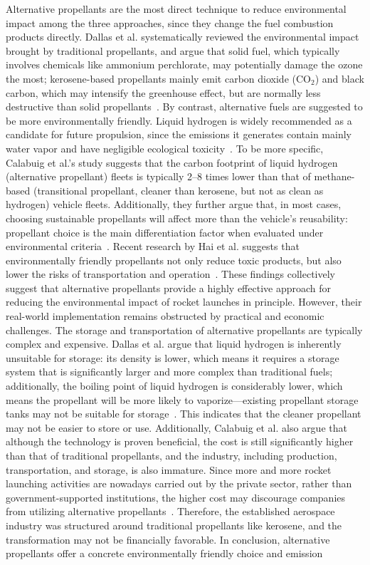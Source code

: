 \documentclass[12pt]{article}
\begin{document}
Alternative propellants are the most direct technique to reduce environmental impact among the three approaches, since they change the fuel combustion products directly. Dallas et al. systematically reviewed the environmental impact brought by traditional propellants, and argue that solid fuel, which typically involves chemicals like ammonium perchlorate, may potentially damage the ozone the most; kerosene-based propellants mainly emit carbon dioxide (CO$_2$) and black carbon, which may intensify the greenhouse effect, but are normally less destructive than solid propellants~\citep{dallas2020review,brown2024inventory}. By contrast, alternative fuels are suggested to be more environmentally friendly. Liquid hydrogen is widely recommended as a candidate for future propulsion, since the emissions it generates contain mainly water vapor and have negligible ecological toxicity~\citep{dallas2020review,barato2023fuels}. To be more specific, Calabuig et al.'s study suggests that the carbon footprint of liquid hydrogen (alternative propellant) fleets is typically 2--8 times lower than that of methane-based (transitional propellant, cleaner than kerosene, but not as clean as hydrogen) vehicle fleets. Additionally, they further argue that, in most cases, choosing sustainable propellants will affect more than the vehicle's reusability: propellant choice is the main differentiation factor when evaluated under environmental criteria~\citep{calabuig2024reusable}. Recent research by Hai et al. suggests that environmentally friendly propellants not only reduce toxic products, but also lower the risks of transportation and operation~\citep{hai2026propellants}. These findings collectively suggest that alternative propellants provide a highly effective approach for reducing the environmental impact of rocket launches in principle. However, their real-world implementation remains obstructed by practical and economic challenges. The storage and transportation of alternative propellants are typically complex and expensive. Dallas et al. argue that liquid hydrogen is inherently unsuitable for storage: its density is lower, which means it requires a storage system that is significantly larger and more complex than traditional fuels; additionally, the boiling point of liquid hydrogen is considerably lower, which means the propellant will be more likely to vaporize---existing propellant storage tanks may not be suitable for storage~\citep{dallas2020review}. This indicates that the cleaner propellant may not be easier to store or use. Additionally, Calabuig et al. also argue that although the technology is proven beneficial, the cost is still significantly higher than that of traditional propellants, and the industry, including production, transportation, and storage, is also immature. Since more and more rocket launching activities are nowadays carried out by the private sector, rather than government-supported institutions, the higher cost may discourage companies from utilizing alternative propellants~\citep{calabuig2024reusable}. Therefore, the established aerospace industry was structured around traditional propellants like kerosene, and the transformation may not be financially favorable. In conclusion, alternative propellants offer a concrete environmentally friendly choice and emission 
\end{document}
